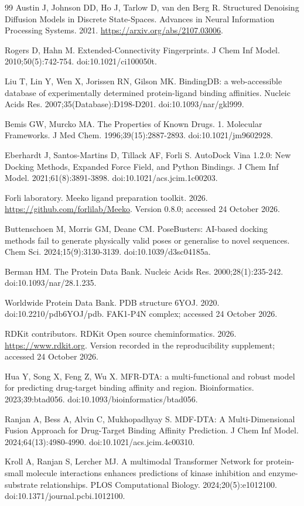 \documentclass[12pt,a4paper]{article}
\begin{document}
\begin{thebibliography}{99}
 Austin J, Johnson DD, Ho J, Tarlow D, van den Berg R. Structured Denoising Diffusion Models in Discrete State-Spaces. Advances in Neural Information Processing Systems. 2021. \url{https://arxiv.org/abs/2107.03006}.

 Rogers D, Hahn M. Extended-Connectivity Fingerprints. J Chem Inf Model. 2010;50(5):742-754. doi:10.1021/ci100050t.

 Liu T, Lin Y, Wen X, Jorissen RN, Gilson MK. BindingDB: a web-accessible database of experimentally determined protein-ligand binding affinities. Nucleic Acids Res. 2007;35(Database):D198-D201. doi:10.1093/nar/gkl999.

 Bemis GW, Murcko MA. The Properties of Known Drugs. 1. Molecular Frameworks. J Med Chem. 1996;39(15):2887-2893. doi:10.1021/jm9602928.

 Eberhardt J, Santos-Martins D, Tillack AF, Forli S. AutoDock Vina 1.2.0: New Docking Methods, Expanded Force Field, and Python Bindings. J Chem Inf Model. 2021;61(8):3891-3898. doi:10.1021/acs.jcim.1c00203.

 Forli laboratory. Meeko ligand preparation toolkit. 2026. \url{https://github.com/forlilab/Meeko}. Version 0.8.0; accessed 24 October 2026.

 Buttenschoen M, Morris GM, Deane CM. PoseBusters: AI-based docking methods fail to generate physically valid poses or generalise to novel sequences. Chem Sci. 2024;15(9):3130-3139. doi:10.1039/d3sc04185a.

 Berman HM. The Protein Data Bank. Nucleic Acids Res. 2000;28(1):235-242. doi:10.1093/nar/28.1.235.

 Worldwide Protein Data Bank. PDB structure 6YOJ. 2020. doi:10.2210/pdb6YOJ/pdb. FAK1-P4N complex; accessed 24 October 2026.

 RDKit contributors. RDKit Open source cheminformatics. 2026. \url{https://www.rdkit.org}. Version recorded in the reproducibility supplement; accessed 24 October 2026.

 Hua Y, Song X, Feng Z, Wu X. MFR-DTA: a multi-functional and robust model for predicting drug-target binding affinity and region. Bioinformatics. 2023;39:btad056. doi:10.1093/bioinformatics/btad056.

 Ranjan A, Bess A, Alvin C, Mukhopadhyay S. MDF-DTA: A Multi-Dimensional Fusion Approach for Drug-Target Binding Affinity Prediction. J Chem Inf Model. 2024;64(13):4980-4990. doi:10.1021/acs.jcim.4c00310.

 Kroll A, Ranjan S, Lercher MJ. A multimodal Transformer Network for protein-small molecule interactions enhances predictions of kinase inhibition and enzyme-substrate relationships. PLOS Computational Biology. 2024;20(5):e1012100. doi:10.1371/journal.pcbi.1012100.
\end{thebibliography}
\end{document}
